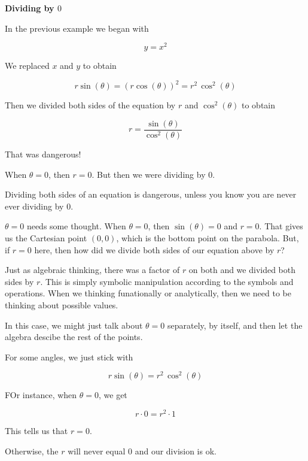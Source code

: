 \documentclass{ximera}
\begin{document}
\begin{warning} \textbf{\textcolor{red!70!black}{Dividing by $0$}}

      In the previous example we began with 

      \[  y = x^2 \] 

We replaced $x$ and $y$ to obtain

   \[  r \sin(\theta) = (r \cos(\theta))^2 = r^2 \, \cos^2(\theta) \] 


Then we divided both sides of the equation by $r$ and $\cos^2(\theta)$ to obtain

\[ r = \frac{\sin(\theta)}{\cos^2(\theta)} \]


That was dangerous!


When $\theta = 0$, then $r = 0$. But then we were dividing by $0$.


Dividing both sides of an equation is dangerous, unless you know you are never ever dividing by $0$.

      $\theta = 0$ needs some thought.  When $\theta = 0$, then $\sin(\theta) = 0$ and $r = 0$.  That gives us the Cartesian point $(0,0)$, which is the bottom point on the parabola.  But, if $r = 0$ here, then how did we divide both sides of our equation above by $r$?

      Just as algebraic thinking, there was a factor of $r$ on both and we divided both sides by $r$.  This is simply symbolic manipulation according to the symbols and operations.  When we thinking funationally or analytically, then we need to be thinking about possible values.

      In this case, we might just talk about $\theta = 0$ separately, by itself, and then let the algebra descibe the rest of the points.  

For some angles, we just stick with 

\[  r \sin(\theta) = r^2 \, \cos^2(\theta) \] 

FOr instance, when $\theta = 0$, we get 

\[  r \cdot 0 = r^2 \cdot 1 \] 

This tells us that $r = 0$.

Otherwise, the $r$ will never equal $0$ and our division is ok.

\end{warning}
\end{document}
